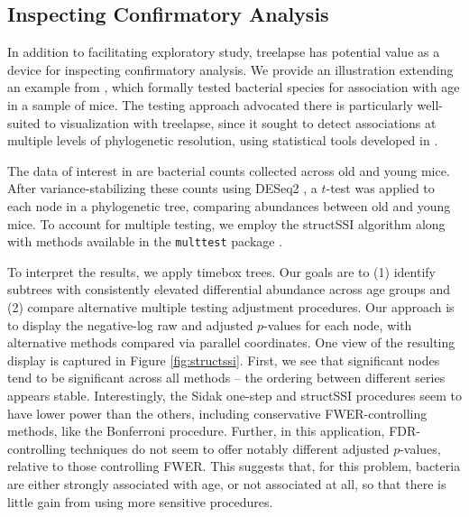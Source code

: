 \documentclass[12pt]{article}
\begin{document}
\subsection{Inspecting Confirmatory Analysis}\label{structssi}

In addition to facilitating exploratory study, treelapse has potential
value as a device for inspecting confirmatory analysis. We provide an
illustration extending an example from \citep{callahan2016bioconductor}, which
formally tested bacterial species for association with age in a sample of mice.
The testing approach advocated there is particularly well-suited to
visualization with treelapse, since it sought to detect associations at multiple
levels of phylogenetic resolution, using statistical tools developed in
\citep{yekutieli2008hierarchical, sankaran2014structssi}.

The data of interest in \citep{callahan2016bioconductor} are bacterial counts
collected across old and young mice. After variance-stabilizing these counts
using DESeq2 \citep{love2014moderated}, a $t$-test was applied to each node in a
phylogenetic tree, comparing abundances between old and young mice. To account
for multiple testing, we employ the structSSI algorithm
\citep{yekutieli2008hierarchical, sankaran2014structssi} along with methods
available in the \texttt{multtest} package \citep{pollard2005multiple}.

To interpret the results, we apply timebox trees. Our goals are to (1) identify
subtrees with consistently elevated differential abundance across age groups and
(2) compare alternative multiple testing adjustment procedures. Our approach is
to display the negative-log raw and adjusted $p$-values for each node, with
alternative methods compared via parallel coordinates. One view of the resulting
display is captured in Figure \ref{fig:structssi}. First, we see that
significant nodes tend to be significant across all methods -- the ordering
between different series appears stable. Interestingly, the Sidak one-step and
structSSI procedures seem to have lower power than the others, including
conservative FWER-controlling methods, like the Bonferroni procedure. Further,
in this application, FDR-controlling techniques do not seem to offer notably
different adjusted $p$-values, relative to those controlling FWER. This suggests
that, for this problem, bacteria are either strongly associated with age, or not
associated at all, so that there is little gain from using more sensitive
procedures.
\end{document}
